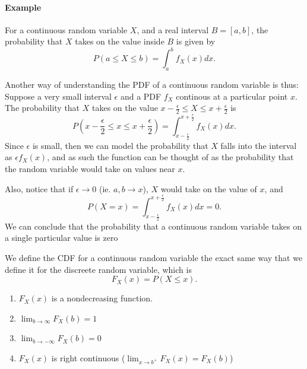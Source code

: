 \documentclass[5pt, a4paper]{article}
\begin{document}
    \paragraph{Example} For a continuous random variable $X$, and a real
    interval $B=[a,b]$, the probability that $X$ takes on the value inside $B$
    is given by  \[
            P(a \le X \le b) = \int_a^b f_X(x) dx
    .\] 
    
    \begin{tcolorbox}[colframe=blue!20!white]
        Another way of understanding the PDF of a continuous random variable is
        thus: Suppose a very small interval $\epsilon$ and a PDF $f_X$ continous
        at a particular point  $x$. The probability that $X$ 
        takes on the value $x - \frac{\epsilon}{2} \le X \le x +
        \frac{\epsilon}{2}$ is \[
        P(x - \frac{\epsilon}{2} \le x \le x + \frac{\epsilon}{2})
        = \int_{x-\frac{\epsilon}{2}}^{x+\frac{\epsilon}{2}} f_X(x) dx
        .\] 
        Since $\epsilon$ is small, then we can model the probability that $X$ 
        falls into the interval as $\epsilon f_X(x)$, and as such the function
        can be thought of as the probability that the random variable would
        take on values near $x$.

        Also, notice that if $\epsilon \to 0$ (ie. $a,b \to x$), $X$ would take
        on the value of $x$, and \[
        P(X = x)
        = \int_{x-\frac{\epsilon}{2}}^{x+\frac{\epsilon}{2}} f_X(x) dx = 0
        .\] 
        We can conclude that the probability that a continuous random variable
        takes on a single particular value is zero
    \end{tcolorbox}

    \begin{tcolorbox}[title= Continuous Distribution Function]
        We define the CDF for a continuous random variable the exact same way
        that we define it for the discreete random variable, which is \[
        F_X(x) = P(X \le x)
        .\] 
    \end{tcolorbox}
    \begin{tcolorbox}[title=Properties of CDF]
        \begin{enumerate}
            \item $F_X(x)$ is a nondecreasing function.
            \item $\lim_{b \to \infty}F_X(b) =1$
            \item $\lim_{b \to -\infty}F_X(b) =0$ 
            \item $F_X(x)$ is right continuous ($\lim_{x \to b^+} F_X(x) =
                F_X(b)$)
        \end{enumerate}
    \end{tcolorbox}
\end{document}
